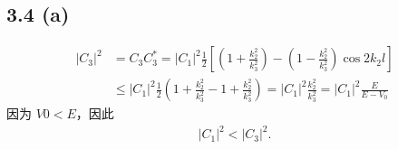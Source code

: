 \subsection{3.4 (a)}
\begin{align}
    |C_3|^2 &= C_3C_3^* = |C_1|^2 \frac12 \left[
        \left(1 + \frac{k_2^2}{k_3^2}\right) - 
        \left(1 - \frac{k_2^2}{k_3^2}\right) \cos 2k_2l
    \right] \\
    &\leq |C_1|^2 \frac12 \left(
        1 + \frac{k_2^2}{k_3^2} - 1 + \frac{k_2^2}{k_3^2}
    \right) = |C_1|^2 \frac{k_2^2}{k_3^2} = |C_1|^2 \frac{E}{E - V_0}
\end{align}
因为 $V0 < E$，因此
\begin{align}
    |C_1|^2 < |C_3|^2.
\end{align}

